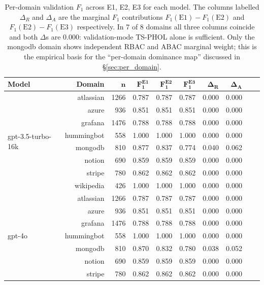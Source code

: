 \documentclass[10pt,a4paper,twocolumn]{article}
\begin{document}
\begin{table}[H]
\centering
\caption{Per-domain validation $F_1$ across E1, E2, E3 for each model. The columns labelled $\Delta_R$ and $\Delta_A$ are the marginal $F_1$ contributions $F_1(\textrm{E1})-F_1(\textrm{E2})$ and $F_1(\textrm{E2})-F_1(\textrm{E3})$ respectively. In $7$ of $8$ domains all three columns coincide and both $\Delta$s are $0.000$: validation-mode TS-PHOL alone is sufficient. Only the mongodb domain shows independent RBAC and ABAC marginal weight; this is the empirical basis for the ``per-domain dominance map'' discussed in \S\ref{sec:per_domain}.}
\label{tab:per_domain_full}
\scriptsize
\setlength{\tabcolsep}{2.6pt}
\begin{tabular}{@{}lrrrrrrrrr@{}}
\toprule
\textbf{Model} & \textbf{Domain} & $\mathbf{n}$ & $\mathbf{F_1^{E1}}$ & $\mathbf{F_1^{E2}}$ & $\mathbf{F_1^{E3}}$ & $\boldsymbol{\Delta_R}$ & $\boldsymbol{\Delta_A}$ \\
\midrule
\multirow{8}{*}{gpt-3.5-turbo-16k}
 & atlassian      & 1266 & 0.787 & 0.787 & 0.787 & 0.000 & 0.000 \\
 & azure          &  936 & 0.851 & 0.851 & 0.851 & 0.000 & 0.000 \\
 & grafana        & 1476 & 0.788 & 0.788 & 0.788 & 0.000 & 0.000 \\
 & hummingbot     &  558 & 1.000 & 1.000 & 1.000 & 0.000 & 0.000 \\
 & mongodb        &  810 & 0.877 & 0.837 & 0.774 & 0.040 & 0.062 \\
 & notion         &  690 & 0.859 & 0.859 & 0.859 & 0.000 & 0.000 \\
 & stripe         &  780 & 0.862 & 0.862 & 0.862 & 0.000 & 0.000 \\
 & wikipedia      &  426 & 1.000 & 1.000 & 1.000 & 0.000 & 0.000 \\
\midrule
\multirow{8}{*}{gpt-4o}
 & atlassian      & 1266 & 0.787 & 0.787 & 0.787 & 0.000 & 0.000 \\
 & azure          &  936 & 0.851 & 0.851 & 0.851 & 0.000 & 0.000 \\
 & grafana        & 1476 & 0.788 & 0.788 & 0.788 & 0.000 & 0.000 \\
 & hummingbot     &  558 & 1.000 & 1.000 & 1.000 & 0.000 & 0.000 \\
 & mongodb        &  810 & 0.870 & 0.832 & 0.780 & 0.038 & 0.052 \\
 & notion         &  690 & 0.859 & 0.859 & 0.859 & 0.000 & 0.000 \\
 & stripe         &  780 & 0.862 & 0.862 & 0.862 & 0.000 & 0.000 \\

\end{tabular}
\end{table}
\end{document}

